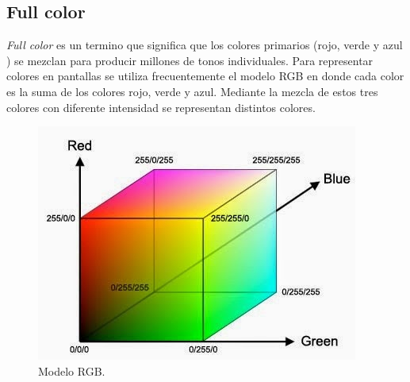\subsection{Full color}
\textit{Full color} es un termino que significa que los colores primarios (rojo, verde y azul ) se mezclan para producir millones de tonos individuales. Para representar colores en pantallas se utiliza frecuentemente el modelo RGB en donde cada color es la suma de los colores rojo, verde y azul. Mediante la mezcla de estos tres colores con diferente intensidad se representan distintos colores.
\begin{figure}[htpb]
	\centering
	\includegraphics[scale=0.6]{Figures/modelorgb.jpg} 
	\caption{Modelo RGB\protect\footnotemark.}
	\label{fig:grafrgb}
\end{figure}






